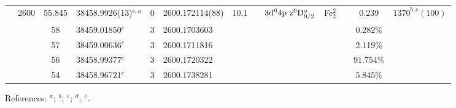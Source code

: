 \begin{table*}
\begin{center}
{\begin{tabular}{:l;l;c;l;c;l;c;l;l;c;c;c;c}
                                  & 2600   & 55.845    & 38458.9926(13)$^{e,a}$           & 0 &   2600.172114(88)  & 10.1 & $                                        $ & $3\rm{d}^64\rm{p~z}^6\rm{D}_{9/2}^{\rm o}$ & Fe$^2_{2}$  &              & 0.239     & $ 1370^{b,c}(100)$\\
\rowstyle{\itshape}               &        & 58        & 38459.01850$^{c}$                & 3 &  2600.1703603      &      & $                                        $ & $                                        $ &             &              & 0.282\%   & $     ^{}     $\\
\rowstyle{\itshape}               &        & 57        & 38459.00636$^{c}$                & 3 &  2600.1711816      &      & $                                        $ & $                                        $ &             &              & 2.119\%   & $     ^{}     $\\
\rowstyle{\itshape}               &        & 56        & 38458.99377$^{c}$                & 3 &  2600.1720322      &      & $                                        $ & $                                        $ &             &              & 91.754\%  & $     ^{}     $\\
\rowstyle{\itshape}               &        & 54        & 38458.96721$^{c}$                & 3 &  2600.1738281      &      & $                                        $ & $                                        $ &             &              & 5.845\%   & $     ^{}     $\\
\hline
\end{tabular}
}
{\footnotesize References:
$^{a}$\citet{Nave:2012:1570};
$^{b}$\citet{Dzuba:2002:022501};
$^{c}$\citet{Porsev:2009:032519};
$^{d}$\citet{Berengut:2006:PhD};
$^{e}$\citet{Aldenius:2009:014008}.}
\end{center}
\end{table*}
